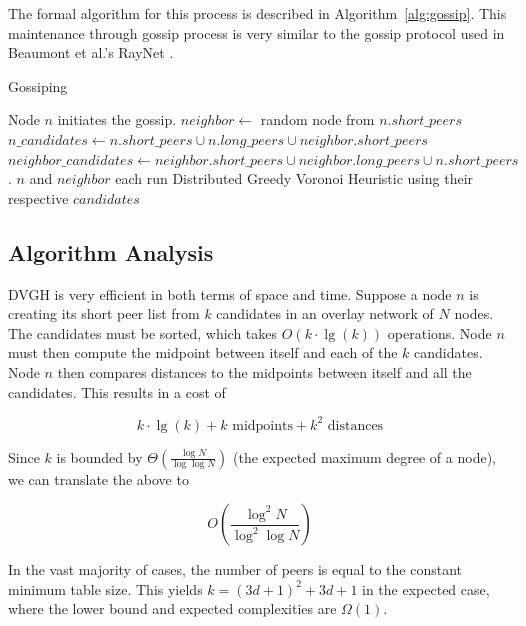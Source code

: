 \documentclass[11pt, conference, letterpaper]{IEEEtran}
\begin{document}
The formal algorithm for this process is described in Algorithm~\ref{alg:gossip}.
This maintenance through gossip process is very similar to the gossip protocol used in Beaumont et al.'s RayNet \cite{raynet}.


\begin{algorithm}
\caption{Gossiping}
\label{alg:gossip}
\begin{algorithmic}[1]  %
	\STATE Node $n$ initiates the gossip.
	\STATE $neighbor \leftarrow$ random node from $n.short\_peers$
   \STATE $n\_candidates \leftarrow n.short\_peers \cup n.long\_peers \cup neighbor.short\_peers$
   \STATE $neighbor\_candidates \leftarrow neighbor.short\_peers \cup neighbor.long\_peers \cup n.short\_peers$.  
   \STATE $n$ and $neighbor$ each run Distributed Greedy Voronoi Heuristic using their respective $candidates$
\end{algorithmic} 
\end{algorithm}












\subsection{Algorithm Analysis}

DVGH is very efficient in both terms of space and time.
Suppose a node $n$ is creating its short peer list from $k$ candidates in an overlay network of $N$ nodes. 
The candidates must be sorted, which takes $O(k\cdot\lg(k))$ operations.  
Node $n$ must then compute the midpoint between itself and each of the $k$ candidates.  
Node $n$ then compares distances to the midpoints between itself and all the candidates.  
This results in a cost of 

\[ k\cdot\lg(k) + k \text{ midpoints}  + k^{2} \text{ distances} \]


Since $k$ is  bounded by $\Theta(\frac{\log N}{\log \log N} )$ \cite{bern1991expected} (the expected maximum degree of a node), we can translate the above to

\[O(\frac{\log^{2} N}{\log^{2} \log N} )\]

In the vast majority of cases, the number of peers is equal to the constant minimum table size. 
This yields $k=(3d+1)^{2}+3d+1$ in the expected case, where the lower bound and expected complexities are $\Omega(1)$.
\end{document}
